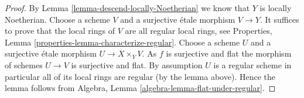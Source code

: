\documentclass[10pt,a4paper]{amsart}
\theoremstyle{plain}
\theoremstyle{definition}
\theoremstyle{remark}
\numberwithin{equation}{subsection}
\begin{document}
\begin{proof}
By
Lemma \ref{lemma-descend-locally-Noetherian}
we know that $Y$ is locally Noetherian.
Choose a scheme $V$ and a surjective \'etale morphism $V \to Y$.
It suffices to prove that the local rings of $V$ are all regular local
rings, see
Properties, Lemma \ref{properties-lemma-characterize-regular}.
Choose a scheme $U$ and a surjective \'etale morphism
$U \to X \times_Y V$. As $f$ is surjective and flat the morphism of schemes
$U \to V$ is surjective and flat. By assumption $U$ is a regular scheme
in particular all of its local rings are regular (by the lemma above).
Hence the lemma follows from
Algebra, Lemma \ref{algebra-lemma-flat-under-regular}.
\end{proof}
\end{document}
